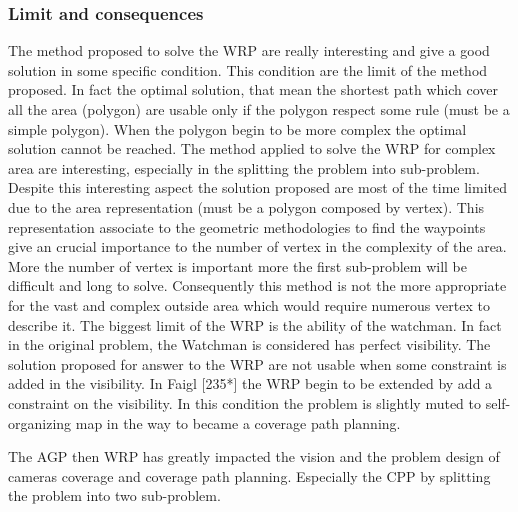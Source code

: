 
\subsubsection{Limit and consequences}

The method proposed to solve the WRP are really interesting and give a good solution in some specific condition. This condition are the limit of the method proposed. In fact the optimal solution, that mean the shortest path  which cover all the area (polygon) are usable only if the polygon respect some rule (must be a simple polygon).  
When the polygon begin to be more complex the optimal solution cannot be reached. The method applied to solve the WRP for complex area are interesting, especially in the splitting the problem into sub-problem. Despite this interesting aspect the solution proposed are most of the time limited due to the area representation (must be a polygon composed by vertex). This representation associate to the geometric methodologies to find the waypoints give an crucial importance to the number of vertex in the complexity of the area. More the number of vertex is important more the first sub-problem will be difficult and long to solve. 
Consequently this method is not the more appropriate for the vast and complex outside area which would require  numerous vertex to describe it.
 The biggest limit of the WRP is the ability of the watchman. In fact in the original problem, the Watchman is considered has perfect visibility. The solution proposed for answer to the WRP are not usable when some constraint is added in the  visibility. 
In Faigl [235*] the WRP begin to be extended by add a constraint on the visibility. In this condition the problem is slightly muted to self-organizing map  in the way to became  a coverage path planning.

The AGP then WRP has greatly impacted the vision and the problem design of cameras coverage and coverage path planning. Especially the CPP by splitting the problem into two sub-problem. 



 


%
%
%

